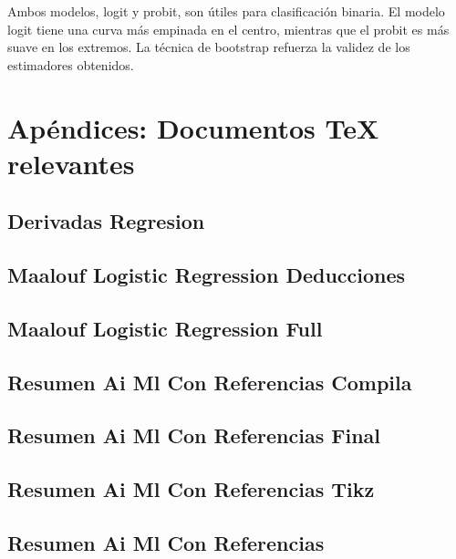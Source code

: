 \documentclass[
]{article}
\begin{document}
Ambos modelos, logit y probit, son útiles para clasificación binaria. El
modelo logit tiene una curva más empinada en el centro, mientras que el
probit es más suave en los extremos. La técnica de bootstrap refuerza la
validez de los estimadores obtenidos.

\section{Apéndices: Documentos TeX
relevantes}\label{apuxe9ndices-documentos-tex-relevantes}

\subsection{Derivadas Regresion}\label{derivadas-regresion}


\subsection{Maalouf Logistic Regression
Deducciones}\label{maalouf-logistic-regression-deducciones}


\subsection{Maalouf Logistic Regression
Full}\label{maalouf-logistic-regression-full}


\subsection{Resumen Ai Ml Con Referencias
Compila}\label{resumen-ai-ml-con-referencias-compila}


\subsection{Resumen Ai Ml Con Referencias
Final}\label{resumen-ai-ml-con-referencias-final}


\subsection{Resumen Ai Ml Con Referencias
Tikz}\label{resumen-ai-ml-con-referencias-tikz}


\subsection{Resumen Ai Ml Con
Referencias}\label{resumen-ai-ml-con-referencias}
\end{document}

